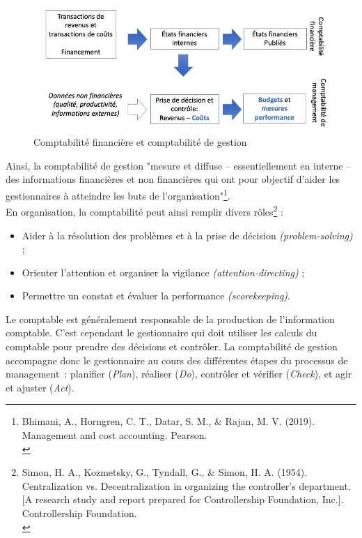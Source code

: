 \documentclass{kaobook}
\begin{document}
\begin{figure}[htbp]
\centering
\includegraphics[width=.9\linewidth]{./img/comptafi.jpeg}
\caption{\label{fig:org1b2f890}Comptabilité financière et comptabilité de gestion}
\end{figure}

Ainsi, la comptabilité de gestion "mesure et diffuse – essentiellement en interne – des informations financières et non financières qui ont pour objectif d'aider les gestionnaires à atteindre les buts de l’organisation"\footnote{Bhimani, A., Horngren, C. T., Datar, S. M., \& Rajan, M. V. (2019). Management and cost accounting. Pearson.\\}.\\

En organisation, la comptabilité peut ainsi remplir divers rôles\footnote{Simon, H. A., Kozmetsky, G., Tyndall, G., \& Simon, H. A. (1954). Centralization vs. Decentralization in organizing the controller’s department. [A research study and report prepared for Controllership Foundation, Inc.]. Controllership Foundation.\\} :\\
\begin{itemize}
\item Aider à la résolution des problèmes et à la prise de décision \emph{(problem-solving)} ;\\
\item Orienter l’attention et organiser la vigilance \emph{(attention-directing)} ;\\
\item Permettre un constat et évaluer la performance \emph{(scorekeeping)}.\\
\end{itemize}

Le comptable est généralement responsable de la production de l'information comptable. C'est cependant le gestionnaire qui doit utiliser les calculs du comptable pour prendre des décisions et contrôler. La comptabilité de gestion accompagne donc le gestionnaire au cours des différentes étapes du processus de management : planifier (\emph{Plan}), réaliser (\emph{Do}), contrôler et vérifier (\emph{Check}), et agir et ajuster (\emph{Act}).\\
\end{document}
